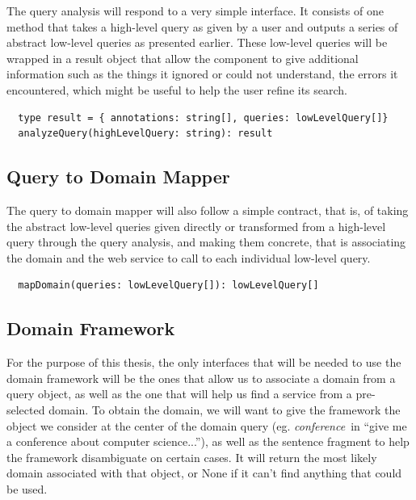 The query analysis will respond to a very simple interface. It consists of one method that takes a high-level query as given by a user and outputs a series of abstract low-level queries as presented earlier. These low-level queries will be wrapped in a result object that allow the component to give additional information such as the things it ignored or could not understand, the errors it encountered, which might be useful to help the user refine its search.

\begin{verbatim}
  type result = { annotations: string[], queries: lowLevelQuery[]}
  analyzeQuery(highLevelQuery: string): result
\end{verbatim}


\subsection{Query to Domain Mapper} %
\label{sub:query_to_domain_mapper_int}

The query to domain mapper will also follow a simple contract, that is, of taking the abstract low-level queries given directly or transformed from a high-level query through the query analysis, and making them concrete, that is associating the domain and the web service to call to each individual low-level query.

\begin{verbatim}
  mapDomain(queries: lowLevelQuery[]): lowLevelQuery[]
\end{verbatim}


\subsection{Domain Framework} %
\label{sub:domain_framework}

For the purpose of this thesis, the only interfaces that will be needed to use the domain framework will be the ones that allow us to associate a domain from a query object, as well as the one that will help us find a service from a pre-selected domain. To obtain the domain, we will want to give the framework the object we consider at the center of the domain query (eg. \emph{conference}\ in ``give me a conference about computer science...''), as well as the sentence fragment to help the framework disambiguate on certain cases. It will return the most likely domain associated with that object, or None if it can't find anything that could be used.

